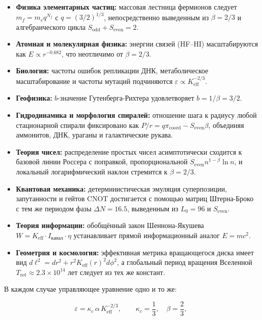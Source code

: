 \documentclass[12pt]{article}
\newcommand{\Seven}{S_{\mathrm{even}}}
\begin{document}
	\begin{itemize}
		\item \textbf{Физика элементарных частиц:} массовая лестница фермионов следует \(m_f = m_e q^{N_f}\) с \(q = (3/2)^{1/3}\), непосредственно выведенным из \(\beta = 2/3\) и алгебраического цикла \(S_{\mathrm{odd}}+S_{\mathrm{even}}=2\).
		\item \textbf{Атомная и молекулярная физика:} энергии связей (HF–HI) масштабируются как \(E \propto r^{-0.682}\), что неотличимо от \(\beta = 2/3\).
		\item \textbf{Биология:} частоты ошибок репликации ДНК, метаболическое масштабирование и частоты мутаций подчиняются \(\varepsilon \propto K_{\mathrm{eff}}^{-2/3}\).
		\item \textbf{Геофизика:} \(b\)-значение Гутенберга-Рихтера удовлетворяет \(b = 1/\beta = 3/2\).
		\item \textbf{Гидродинамика и морфология спиралей:} отношение шага к радиусу любой стационарной спирали фиксировано как \(P/r = q \pi_{\mathrm{coord}} - S_{\mathrm{even}}\beta\), объединяя аммонитов, ДНК, ураганы и галактические рукава.
		\item \textbf{Теория чисел:} распределение простых чисел асимптотически сходится к базовой линии Россера с поправкой, пропорциональной \(\Seven n^{1-\beta}\ln n\), и локальный логарифмический наклон стремится к \(\beta = 2/3\).
		\item \textbf{Квантовая механика:} детерминистическая эмуляция суперпозиции, запутанности и гейтов CNOT достигается с помощью матриц Штерна-Броко с тем же периодом фазы \(\Delta N = 16.5\), выведенным из \(L_0=96\) и \(\Seven\).
		\item \textbf{Теория информации:} обобщённый закон Шеннона-Якушева \(W = K_{\mathrm{eff}} \cdot I_{\mathrm{канал}} \cdot \eta\) устанавливает прямой информационный аналог \(E = mc^2\).
		\item \textbf{Геометрия и космология:} эффективная метрика вращающегося диска имеет вид \(d\ell^2 = dr^2 + r^2 K_{\mathrm{eff}}(r)^2 d\phi^2\), а глобальный период вращения Вселенной \(T_{\mathrm{rot}} \approx 2.3\times10^{14}\) лет следует из тех же констант.
	\end{itemize}
	
	В каждом случае управляющее уравнение одно и то же:
	
	\begin{equation}
		\boxed{ \varepsilon = \kappa_c \, \alpha \, K_{\mathrm{eff}}^{-2/3} },
		\qquad \kappa_c = \frac{1}{3},\quad \beta = \frac{2}{3},
	\end{equation}
	
\end{document}
